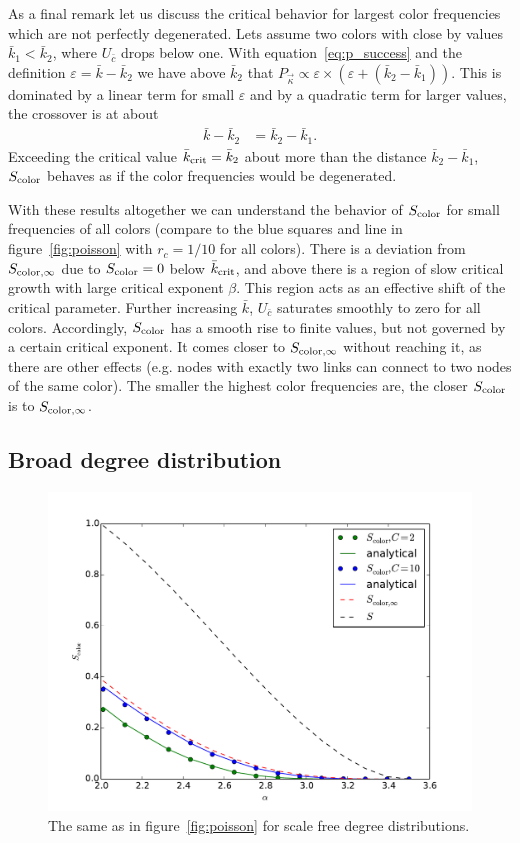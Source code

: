 \documentclass[aps, pre, onecolumn, a4paper, floatfix]{revtex4}
\begin{document}
As a final remark let us discuss the critical behavior for largest color frequencies which 
are not perfectly degenerated. Lets assume two colors with close by values 
${\bar k}_1< {\bar k}_2$, where $U_{\bar c}$ drops below one. With equation~\ref{eq:p_success} and the definition 
$\varepsilon={\bar k}-{\bar k}_2$ we have above ${\bar k}_2$ that 
$P_{\vec \kappa} \propto \varepsilon \times (\varepsilon+({\bar k}_2 - {\bar k}_1))$. This 
is dominated by a linear term for small $\varepsilon$ and by a quadratic term for larger 
values, the crossover is at about
\begin{align}
{\bar k}-{\bar k}_2 &= {\bar k}_2-{\bar k}_1.
\end{align}
Exceeding the critical value ${\bar k}_{\rm crit}={\bar k}_2$ about more than the 
distance ${\bar k}_2 - {\bar k}_1$, $S_{\rm color}$ behaves as 
if the color frequencies would be degenerated. 

With these results altogether we can understand the behavior of $S_{\rm color}$ 
for small frequencies of all colors (compare to the blue squares and line in 
figure~\ref{fig:poisson} with $r_c=1/10$ for all colors). There is a deviation 
from $S_{{\rm color},\infty}$ due to $S_{\rm color}=0$ below ${\bar k}_{\rm crit}$, and 
above there is a region of slow critical growth with large critical exponent $\beta$. This region acts as an effective 
shift of the critical parameter. Further increasing $\bar k$, $U_{\bar c}$ saturates smoothly to zero for all colors. 
Accordingly, $S_{\rm color}$ has a smooth rise to finite values, but not governed by a certain critical exponent. 
It comes closer to $S_{{\rm color},\infty}$ without reaching it, as there are other effects (e.g. nodes with 
exactly two links can connect to two nodes of the same color). The smaller the highest color frequencies are, 
the closer $S_{\rm color}$ is to $S_{{\rm color},\infty}$.





\subsection{Broad degree distribution}

\begin{figure}[htb]
\begin{center}
    \includegraphics[width=0.6\columnwidth]{S_color_broad.pdf}
    \caption{The same as in figure~\ref{fig:poisson} for scale free degree distributions. }
    \label{fig:broad}
\end{center}
\end{figure}
\end{document}
